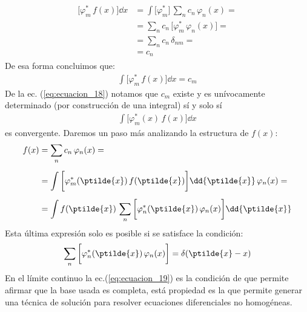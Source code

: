 \begin{align}
\begin{aligned}
\bigg[ \varphi_{m}^{*} \, f(x) \bigg] \dd{x} &= \int \bigg[ \varphi_{m}^{*} \bigg] \, \sum_{n} c_{n} \, \varphi_{n} (x) = \\[0.5em]
&= \sum_{n} c_{n} \, \bigg[ \varphi_{m}^{*} \, \varphi_{n} (x) \bigg] = \\[0.5em]
&= \sum_{n} c_{n} \, \delta_{nm} = \\[0.5em]
&= c_{n}
\end{aligned}
\label{eq:ecuacion_17}
\end{align}
De esa forma concluimos que:
\begin{align}
\int \bigg[ \varphi_{m}^{*} \, f(x) \bigg] \dd{x} = c_{m}
\label{eq:ecuacion_18}
\end{align}
De la ec. (\ref{eq:ecuacion_18}) notamos que $c_{m}$ existe y es unívocamente determinado (por construcción de una integral) sí y solo sí
\begin{align*}
\int \bigg[ \varphi_{m}^{*}(x) \, f(x) \bigg] \dd{x} 
\end{align*}
es convergente. Daremos un paso más analizando la estructura de $f(x)$:
\begin{align}
\begin{aligned}
f(x) &= \sum_{n} c_{n} \, \varphi_{n}(x) = \\[0.5em]
&= \int \bigg[ \varphi_{m}^{*}(\ptilde{x}) \, f(\ptilde{x}) \bigg] \dd{\ptilde{x}} \, \varphi_{n} (x) = \\[0.5em]
&= \int f(\ptilde{x}) \, \sum_{n} \bigg[ \varphi_{n}^{*}(\ptilde{x}) \, \varphi_{n}(x) \bigg] \dd{\ptilde{x}}
\end{aligned}
\label{eq:ecuacion_19}
\end{align}
Esta última expresión solo es posible si se satisface la condición:
\begin{align}
\sum_{n} \bigg[ \varphi_{n}^{*}(\ptilde{x}) \, \varphi_{n}(x) \bigg] = \delta(\ptilde{x} - x)
\label{eq:ecuacion_20}
\end{align}
En el límite continuo la ec.(\ref{eq:ecuacion_19}) es la condición de que permite afirmar que la base usada es completa, está propiedad es la que permite generar una técnica de solución para resolver ecuaciones diferenciales no homogéneas.
